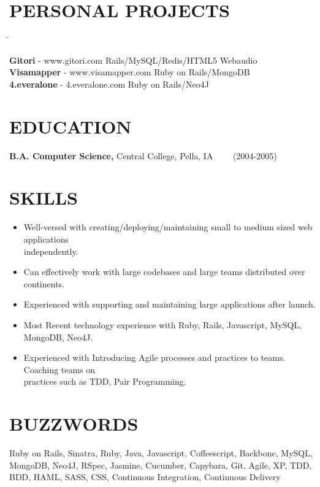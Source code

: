 \documentclass{res}
\begin{document}
\begin{resume}
\section{PERSONAL PROJECTS}  \vspace{-0.01in}   
   \begin{tabbing}
   \hspace{3.3in}\= \kill %

    {\bf Gitori} - www.gitori.com   \>Rails/MySQL/Redis/HTML5 Webaudio \\

    {\bf Visamapper} - www.visamapper.com   \>Ruby on Rails/MongoDB \\
 
    {\bf 4.everalone} - 4.everalone.com \>Ruby on Rails/Neo4J \\
\end{tabbing}

\section{EDUCATION}\vspace{0.15in}
    {\bf B.A. Computer Science,} Central College, Pella, IA
\ \ \ \   (2004-2005)


\section{SKILLS} \vspace{0.3in}         
 \begin{itemize} \itemsep 0pt  
 \setlength{\itemindent}{-1.8em}
\item Well-versed with creating/deploying/maintaining small to medium sized web applications\\ independently.
\item Can effectively work with large codebases and large teams distributed over continents.
\item Experienced with supporting and maintaining large applications after launch.
\item Most Recent technology experience with Ruby, Rails, Javascript, MySQL, MongoDB, Neo4J. 
\item Experienced with Introducing Agile processes and practices to teams. Coaching teams on \\practices such as TDD, Pair Programming.

 \end{itemize}


\section{BUZZWORDS}\vspace{0.15in}
Ruby on Rails, Sinatra, Ruby, Java, Javascript, Coffeescript, Backbone, MySQL, MongoDB, Neo4J, RSpec, Jasmine, Cucumber, Capybara, Git, Agile, XP, TDD, BDD, HAML, SASS, CSS, Continuous Integration, Continuous Delivery 
 
\end{resume}
\end{document}
